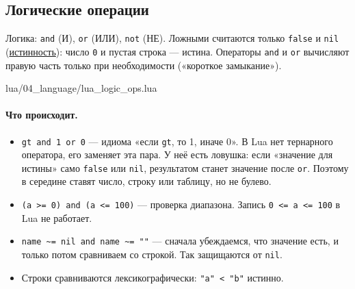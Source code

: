 \subsection{Логические операции}

Логика: \verb|and| (И), \verb|or| (ИЛИ), \verb|not| (НЕ). Ложными считаются только \verb|false| и \verb|nil| (\hyperlink{term:truthiness}{истинность}): число \verb|0| и пустая строка --- истина. Операторы \verb|and| и \verb|or| вычисляют правую часть только при необходимости («короткое замыкание»).

\begin{codefile}{lua/04_language/lua_logic_ops.lua}
\end{codefile}

\paragraph{Что происходит.}
\begin{itemize}
    \item \verb|gt and 1 or 0| --- идиома «если \verb|gt|, то 1, иначе 0». В Lua нет тернарного оператора, его заменяет эта пара. У неё есть ловушка: если «значение для истины» само \verb|false| или \verb|nil|, результатом станет значение после \verb|or|. Поэтому в середине ставят число, строку или таблицу, но не булево.
    \item \verb|(a >= 0) and (a <= 100)| --- проверка диапазона. Запись \verb|0 <= a <= 100| в Lua не работает.
    \item \verb|name ~= nil and name ~= ""| --- сначала убеждаемся, что значение есть, и только потом сравниваем со строкой. Так защищаются от \verb|nil|.
    \item Строки сравниваются лексикографически: \verb|"a" < "b"| истинно.
\end{itemize}


